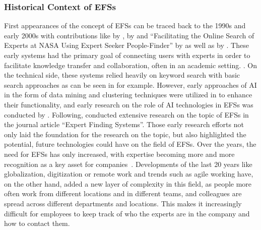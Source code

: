 \subsubsection{Historical Context of \aclp{EFS}}
First appearances of the concept of \acp{EFS} can be traced back to the 1990s and early 2000s with contributions like  by \textcite{ackerman_answer_1990},  by \textcite{mattox_enterprise_1999} and “Facilitating the Online Search of Experts at NASA Using Expert Seeker People-Finder” by \textcite{becerra-fernandez_facilitating_2000} as well as  by \textcite{becerra-fernandez_searchable_1999}. These early systems had the primary goal of connecting users with experts in order to facilitate knowledge transfer and collaboration, often in an academic setting. \parencite[1]{mattox_enterprise_1999} \parencite[3-3]{becerra-fernandez_facilitating_2000} \parencite[3]{becerra-fernandez_searchable_1999}. On the technical side, these systems relied heavily on keyword search with basic search approaches as can be seen in \textcite[4-5]{mattox_enterprise_1999} for example. However, early approaches of \ac{AI} in the form of data mining and clustering techniques were utilized in \textcite[3-1]{becerra-fernandez_facilitating_2000} to enhance their functionality, and early research on the role of \ac{AI} technologies in \acp{EFS} was conducted by \textcite{becerra-fernandez_role_2000}. Following, \textcite{maybury_expert_2006} conducted extensive research on the topic of \acp{EFS} in the journal article “Expert Finding Systems”. Those early research efforts not only laid the foundation for the research on the topic, but also highlighted the potential, future technologies could have on the field of \acp{EFS}. Over the years, the need for \acp{EFS} has only increased, with expertise becoming more and more recognition as a key asset for companies \parencite[1]{husain_expert_2019}. Developments of the last 20 years like globalization, digitization or remote work and trends such as agile working have, on the other hand, added a new layer of complexity in this field, as people more often work from different locations and in different teams, and colleagues are spread across different departments and locations. This makes it increasingly difficult for employees to keep track of who the experts are in the company and how to contact them.

